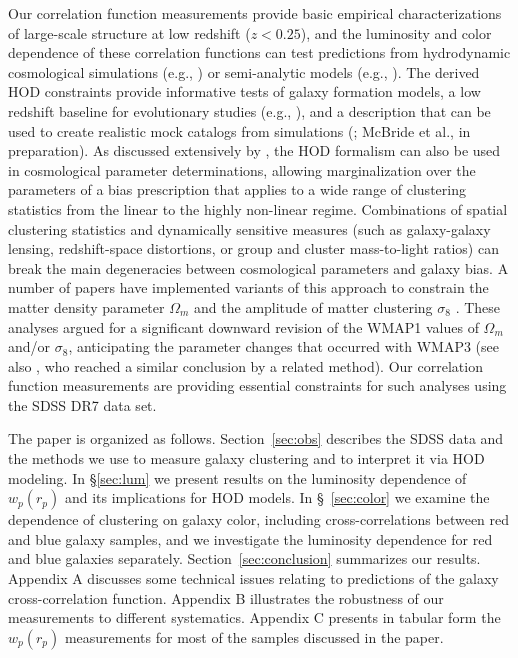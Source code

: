 \documentclass[]{emulateapj}
\newcommand{\wrp}{{w_p(r_p)}}
\begin{document}
Our correlation function measurements provide basic empirical characterizations
of large-scale structure at low redshift ($z<0.25$), and the luminosity and
color dependence of these correlation functions can test predictions
from hydrodynamic cosmological simulations 
(e.g., \citealt{pearce01,weinberg04}) or semi-analytic models
(e.g., \citealt{kang05,croton06,bower06}).
The derived HOD constraints provide informative tests of galaxy
formation models, a low redshift baseline for evolutionary studies
(e.g., \citealt{zheng07,brown08}), and a description that can
be used to create realistic mock catalogs from simulations
(\citealt{scoccimarro02,wechsler04,eisenstein05b,skibbasheth09}; 
McBride et al., in preparation).
As discussed extensively by \cite{zheng07a}, the HOD formalism
can also be used in cosmological parameter determinations,
allowing marginalization over the parameters of a bias prescription
that applies to a wide range of clustering statistics from the
linear to the highly non-linear regime.  Combinations of spatial
clustering statistics and dynamically sensitive measures
(such as galaxy-galaxy lensing, redshift-space distortions, or group and
cluster mass-to-light ratios) can break the main degeneracies
between cosmological parameters and galaxy bias.  A number of
papers have implemented variants of this approach to constrain
the matter density parameter $\Omega_m$ and the amplitude of
matter clustering $\sigma_8$ 
\citep{bosch03b,abazajian05,tinker05,bosch07,cacciato09,rozo10}.
These analyses argued for a significant downward revision of the 
WMAP1 values of $\Omega_m$ and/or $\sigma_8$, anticipating the
parameter changes that occurred with WMAP3 (see also \citealt{vale06},
who reached a similar conclusion by a related method).
Our correlation function measurements are providing essential
constraints for such analyses using the SDSS DR7 data set.

The paper is organized as follows.
Section~\ref{sec:obs} describes the SDSS data and the methods we use to 
measure galaxy clustering and to interpret it via HOD modeling.  In 
\S\ref{sec:lum} we present results on the luminosity dependence
of $\wrp$ and its implications for HOD models.
In \S~\ref{sec:color} we examine the dependence of clustering on
galaxy color, including cross-correlations between red and blue galaxy
samples, and we investigate the luminosity dependence for
red and blue galaxies separately.
Section~\ref{sec:conclusion} summarizes our results.
Appendix A discusses some technical issues relating to predictions of the
galaxy cross-correlation function.
Appendix B illustrates the robustness of our measurements to different 
systematics.
Appendix C presents in tabular form the $\wrp$ measurements for
most of the samples discussed in the paper.
\end{document}
